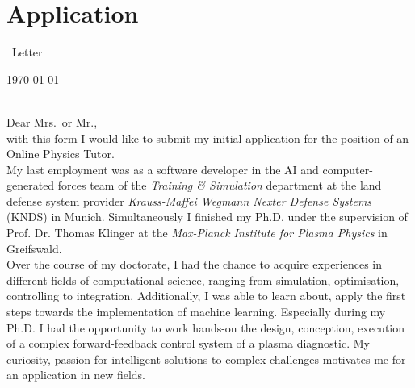 \documentclass[11pt,a4paper]{moderncv}
\newcommand{\position}{%
    an Online Physics Tutor}%
\newcommand{\posaddress}{%
    }%
\begin{document}
\chapter{Application}{~Letter}%
%
\begin{minipage}{0.6\textwidth}%
    \begin{flushleft}%
        \vspace*{.7cm}%
    \end{flushleft}%
\end{minipage}%
\hfill%
\begin{minipage}{0.3\textwidth}%
    \begin{flushright}%
        \vspace*{.7cm}%
        \today%
    \end{flushright}%
\end{minipage}%
%
\vspace*{.5cm}%
{\bfseries%
}\\[0.25cm]%
%
Dear Mrs.\ or Mr.,\\[0.25cm]%
%
with this form I would like to submit my initial application for the position of \position.\\[0.25cm]  %
%
My last employment was as a software developer in the AI and computer-generated forces team of the \textit{Training \& Simulation} department at the land defense system provider \textit{Krauss-Maffei Wegmann Nexter Defense Systems} (KNDS) in Munich. Simultaneously I finished my Ph.D. under the supervision of Prof. Dr. Thomas Klinger at the \textit{Max-Planck Institute for Plasma Physics} in Greifswald.\\[0.25cm]%
%
Over the course of my doctorate, I had the chance to acquire experiences in different fields of computational science, ranging from simulation, optimisation, controlling to integration. Additionally, I was able to learn about, apply the first steps towards the implementation of machine learning. Especially during my Ph.D. I had the opportunity to work hands-on the design, conception, execution of a complex forward-feedback control system of a plasma diagnostic. My curiosity, passion for intelligent solutions to complex challenges motivates me for an application in new fields.\\[0.25cm]%
\end{document}
